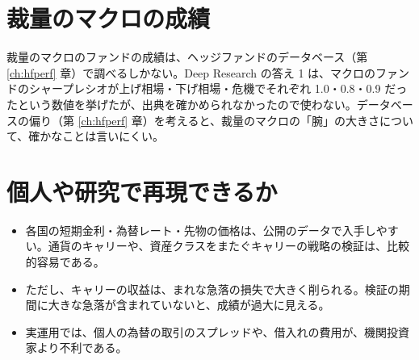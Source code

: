 \section{裁量のマクロの成績}

裁量のマクロのファンドの成績は、ヘッジファンドのデータベース（第 \ref{ch:hfperf} 章）で調べるしかない。Deep Research の答え 1 は、マクロのファンドのシャープレシオが上げ相場・下げ相場・危機でそれぞれ 1.0・0.8・0.9 だったという数値を挙げたが、出典を確かめられなかったので使わない。データベースの偏り（第 \ref{ch:hfperf} 章）を考えると、裁量のマクロの「腕」の大きさについて、確かなことは言いにくい。

\section{個人や研究で再現できるか}

\begin{itemize}
\item 各国の短期金利・為替レート・先物の価格は、公開のデータで入手しやすい。通貨のキャリーや、資産クラスをまたぐキャリーの戦略の検証は、比較的容易である。
\item ただし、キャリーの収益は、まれな急落の損失で大きく削られる。検証の期間に大きな急落が含まれていないと、成績が過大に見える。
\item 実運用では、個人の為替の取引のスプレッドや、借入れの費用が、機関投資家より不利である。
\end{itemize}
